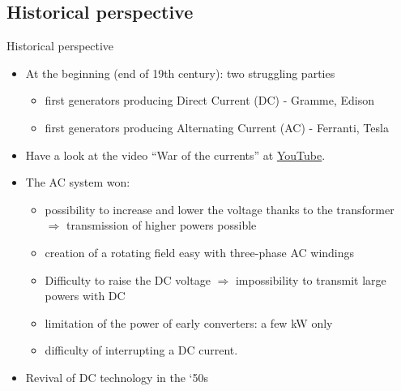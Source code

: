 \subsection{Historical perspective}

\begin{frame}[allowframebreaks]{Historical perspective}
\begin{itemize}
    \item At the beginning (end of 19th century): two struggling parties
    \begin{itemize}
        \item first generators producing Direct Current (DC) - Gramme, Edison
        \item first generators producing Alternating Current (AC) - Ferranti, Tesla
    \end{itemize}
    \item Have a look at the video ``War of the currents'' at \href{https://www.youtube.com/watch?v=dIfIRj0Crc8}{\underline{YouTube}}.
    \item The AC system won:
    \begin{itemize}
        \item possibility to increase and lower the voltage thanks to the transformer $\Rightarrow$ transmission of higher powers possible
        \item creation of a rotating field easy with three-phase AC windings
        \item Difficulty to raise the DC voltage $\Rightarrow$ impossibility to transmit large powers with DC
        \item limitation of the power of early converters: a few kW only
        \item difficulty of interrupting a DC current.
    \end{itemize}
    \item Revival of DC technology in the ‘50s
\end{itemize}



\end{frame}
